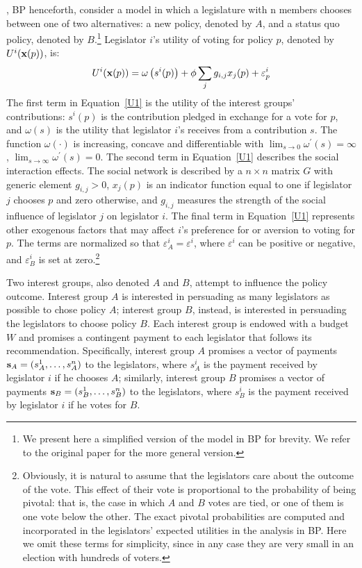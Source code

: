 \documentclass[nojss]{jss}
\begin{document}
\cite*{Battaglini+Patacchini:2018}, BP henceforth, consider a model in which
a legislature with n members chooses between one of two alternatives: a new
policy, denoted by $A$, and a status quo policy, denoted by $B$.\footnote{We
present here a simplified version of the model in BP for brevity.  We refer
to the original paper for the more general version.} Legislator $i$'s
utility of voting for policy $p$, denoted by $U^{i}({\bf x}(p))$, is:
%
\begin{equation}
U^{i}({\bf x}(p))=\omega \left( s^{i}(p)\right) +\phi
\sum_{j}g_{i,j}x_{j}(p)+\varepsilon _{p}^{i}  \label{U1}
\end{equation}%
%
The first term in Equation~\ref{U1} is the utility of the interest groups'
contributions: $s^{i}(p)$ is the contribution pledged in exchange for a vote
for $p$, and $\omega \left( s\right) $ is the utility that legislator $i$'s
receives from a contribution $s$.  The function $\omega (\cdot )$ is
increasing, concave and differentiable with $\lim_{s\rightarrow 0}\omega
^{\prime }(s)=\infty $, $\lim_{s\rightarrow \infty }\omega ^{\prime }(s)=0$. 
The second term in Equation~\ref{U1} describes the social interaction effects.  The
social network is described by a $n\times n$ matrix $G$ with generic element
$g_{i,j}>0$, $x_{j}(p)$ is an indicator function equal to one if legislator
$j$ chooses $p$ and zero otherwise, and $g_{i,j}$ measures the strength of
the social influence of legislator $j$ on legislator $i$.  The final term in
Equation~\ref{U1} represents other exogenous factors that may affect $i$'s
preference for or aversion to voting for $p$.  The terms are normalized so
that $\varepsilon _{A}^{i}=\varepsilon ^{i}$, where $\varepsilon ^{i}$ can
be positive or negative, and $\varepsilon _{B}^{i}$ is set at
zero.\footnote{Obviously, it is natural to assume that the legislators care
about the outcome of the vote.  This effect of their vote is proportional to
the probability of being pivotal: that is, the case in which $A$ and $B$
votes are tied, or one of them is one vote below the other.  The exact
pivotal probabilities are computed and incorporated in the legislators'
expected utilities in the analysis in BP.  Here we omit these terms for
simplicity, since in any case they are very small in an election with
hundreds of voters.}

Two interest groups, also denoted $A$ and $B$, attempt to influence the
policy outcome.  Interest group $A$ is interested in persuading as many
legislators as possible to chose policy $A$; interest group $B$, instead, is
interested in persuading the legislators to choose policy $B$.  Each
interest group is endowed with a budget $W$ and promises a contingent
payment to each legislator that follows its recommendation.  Specifically,
interest group $A$ promises a vector of payments ${\bf
s}_{A}=(s_{A}^{1},\dots, s_{A}^{n})$ to the legislators, where $s_{A}^{i}$ is
the payment received by legislator $i$ if he chooses $A$; similarly,
interest group $B$ promises a vector of payments ${\bf
s}_{B}=(s_{B}^{1},\dots,s_{B}^{n}) $ to the legislators, where $s_{B}^{i}$ is
the payment received by legislator $i$ if he votes for $B$.
\end{document}
